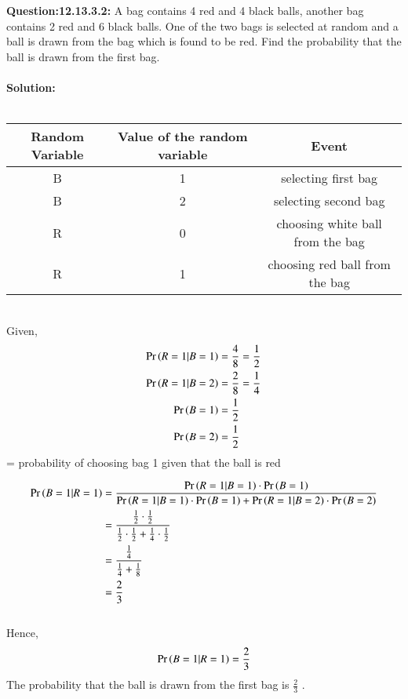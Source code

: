 \documentclass[journal,12pt,onecolumn]{IEEEtran}
\begin{document}
\maketitle
\bigskip
\textbf{Question:12.13.3.2:} A bag contains 4 red and 4 black balls, another bag contains 2 red and 6 black balls. One of the two bags is selected at random and a ball is drawn from the bag which is found to be red. Find the probability that the ball is drawn from the first bag.
\\
\\
\textbf{Solution:}
\\
\\
\begin{tabular}{|c|c|c|}
\hline
Random Variable & Value of the random variable & Event \\
\hline
B & 1 & selecting first bag \\
\hline
B & 2 & selecting second bag \\
\hline
R & 0 & choosing white ball from the bag \\
\hline
R & 1 & choosing red ball from the bag \\
\hline
\end{tabular}
\bigskip
\\
Given,
\begin{align}
\Pr\left(R=1|B=1\right)&=\frac{4}{8}=\frac{1}{2} \\ 
\Pr\left(R=1|B=2\right)&=\frac{2}{8}=\frac{1}{4} \\ 
\Pr\left(B=1\right)&=\frac{1}{2} \\ 
\Pr\left(B=2\right)&=\frac{1}{2} 
\end{align}
= probability of choosing bag 1 given that the ball is red 

\begin{align}
\Pr\left(B=1|R=1\right) &= \frac{\Pr\left(R=1|B=1\right) \cdot \Pr\left(B=1\right)}{\Pr\left(R=1|B=1\right) \cdot \Pr\left(B=1\right) + \Pr\left(R=1|B=2\right) \cdot \Pr\left(B=2\right)} \\
&= \frac{\frac{1}{2} \cdot \frac{1}{2}}{\frac{1}{2} \cdot \frac{1}{2} + \frac{1}{4} \cdot \frac{1}{2}}\\
&= \frac{\frac{1}{4}}{\frac{1}{4} + \frac{1}{8}} \\
&= \frac{2}{3} 
\end{align}
\\Hence, $$ \Pr\left(B=1|R=1\right)=\frac{2}{3}$$ 
The probability that the ball is drawn from the first bag is $\frac{2}{3}$ .
\end{document}
